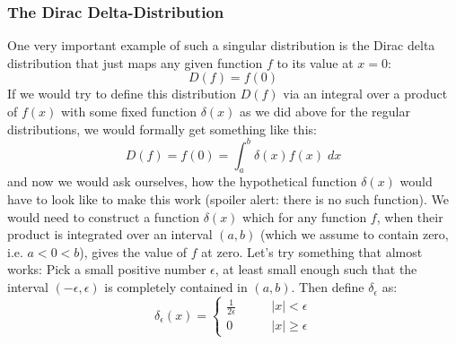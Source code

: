 \subsubsection{The Dirac Delta-Distribution}
One very important example of such a singular distribution is the Dirac delta distribution that just maps any given function $f$ to its value at $x = 0$:
\begin{equation}
 D(f) = f(0)
\end{equation}
If we would try to define this distribution $D(f)$ via an integral over a product of $f(x)$ with some fixed function $\delta(x)$ as we did above for the regular distributions, we would formally get something like this:
\begin{equation}
\label{Eq:DiracDeltaDesired}
 D(f) = f(0) = \int_a^b \delta(x) f(x) \; dx
\end{equation}
and now we would ask ourselves, how the hypothetical function $\delta(x)$ would have to look like to make this work (spoiler alert: there is no such function). We would need to construct a function $\delta(x)$ which for any function $f$, when their product is integrated over an interval $(a,b)$ (which we assume to contain zero, i.e. $a < 0 < b$), gives the value of $f$ at zero. Let's try something that almost works: Pick a small positive number $\epsilon$, at least small enough such that the interval $(-\epsilon, \epsilon)$ is completely contained in $(a,b)$. Then define $\delta_{\epsilon}$ as:
\begin{equation}
\delta_{\epsilon} (x) = 
\begin{cases} 
 \frac{1}{2 \epsilon} \qquad & |x|   <  \epsilon \\
 0                    \qquad & |x| \geq \epsilon
\end{cases} 
\end{equation}

